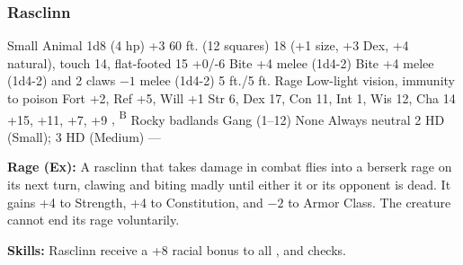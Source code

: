 \subsubsection{Rasclinn}
\begin{MonsterStats}
{Small Animal}
{1d8 (4 hp)}
{+3}
{60 ft. (12 squares)}
{18 (+1 size, +3 Dex, +4 natural), touch 14, flat-footed 15}
{+0/-6}
{Bite +4 melee (1d4-2)}
{Bite +4 melee (1d4-2) and 2 claws $-1$ melee (1d4-2)}
{5 ft./5 ft.}
{Rage}
{Low-light vision, immunity to poison}
{Fort +2, Ref +5, Will +1}
{Str 6, Dex 17, Con 11, Int 1, Wis 12, Cha 14}
{ +15,  +11,  +7,  +9}
{, \textsuperscript{B}}
{Rocky badlands}
{Gang (1--12)}
{\onehalf}
{None}
{Always neutral}
{2 HD (Small); 3 HD (Medium)}
{---}
\end{MonsterStats}

\textbf{Rage (Ex):} A rasclinn that takes damage in combat flies into a berserk rage on its next turn, clawing and biting madly until either it or its opponent is dead. It gains +4 to Strength, +4 to Constitution, and $-2$ to Armor Class. The creature cannot end its rage voluntarily.

\textbf{Skills:} Rasclinn receive a +8 racial bonus to all ,  and  checks.
